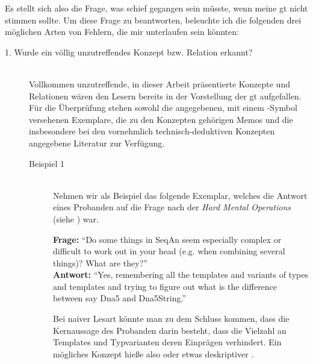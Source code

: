 Es stellt sich also die Frage, was schief gegangen sein müsste, wenn meine \gls{gt} nicht stimmen sollte. Um diese Frage zu beantworten, beleuchte ich die folgenden drei möglichen Arten von Fehlern, die mir unterlaufen sein könnten:
\begin{description}
  \item[1. Wurde ein völlig unzutreffendes Konzept bzw. Relation erkannt?] \hfill \\
  Vollkommen unzutreffende, in dieser Arbeit präsentierte Konzepte und Relationen wären den Lesern bereits in der Vorstellung der \gls{gt} aufgefallen. Für die Überprüfung stehen sowohl die angegebenen, mit einem -Symbol versehenen Exemplare, die zu den Konzepten gehörigen Memos und die insbesondere bei den vornehmlich technisch-deduktiven Konzepten angegebene Literatur zur Verfügung.

  \begin{description}
    \item[Beispiel 1] \hfill \\
    Nehmen wir als Beispiel das folgende Exemplar, welches die Antwort eines Probanden auf die Frage nach der  \textit{Hard Mental Operations} (siehe ) war.
  
    \textbf{Frage:} ``Do some things in SeqAn seem especially complex or difficult to work out in your head (e.g. when combining several things)? What are they?''\\
    \textbf{Antwort:} ``Yes, remembering all the templates and variants of types and templates and trying to figure out what is the difference between say Dna5 and Dna5String.''
    
    Bei naiver Lesart könnte man zu dem Schluss kommen, dass die Kernaussage des Probanden darin besteht, dass die Vielzahl an Templates und Typvarianten deren Einprägen verhindert. Ein mögliches Konzept hieße also  oder etwas deskriptiver .
    

\end{description}
\end{description}

